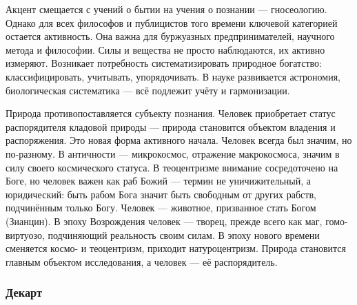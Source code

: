 

Акцент смещается с учений о бытии на учения о познании --- гносеологию. Однако для всех философов и публицистов того времени ключевой категорией остается активность. Она важна для буржуазных предпринимателей, научного метода и философии. Силы и вещества не просто наблюдаются, их активно измеряют. Возникает потребность систематизировать природное богатство: классифицировать, учитывать, упорядочивать. В науке развивается астрономия, биологическая систематика --- всё подлежит учёту и гармонизации.

Природа противопоставляется субъекту познания. Человек приобретает статус распорядителя кладовой природы --- природа становится объектом владения и распоряжения. Это новая форма активного начала.
Человек всегда был значим, но по-разному. В античности --- микрокосмос, отражение макрокосмоса, значим в силу своего космического статуса. В теоцентризме внимание сосредоточено на Боге, но человек важен как раб Божий --- термин не уничижительный, а юридический: быть рабом Бога значит быть свободным от других рабств, подчинённым только Богу. Человек --- животное, призванное стать Богом (Зианцин). В эпоху Возрождения человек --- творец, прежде всего как маг, гомо-виртуозо, подчиняющий реальность своим силам. В эпоху нового времени сменяется космо- и теоцентризм, приходит натуроцентризм. Природа становится главным объектом исследования, а человек --- её распорядитель.


\subsubsection{Декарт}


